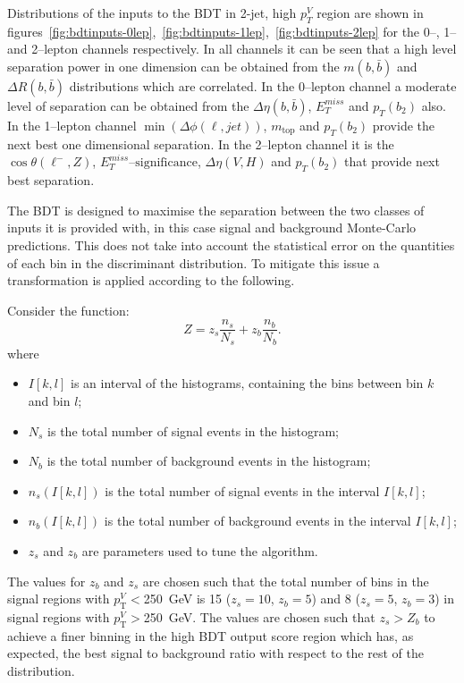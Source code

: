 Distributions of the inputs to the BDT in 2-jet, high $p_T^V$ region are shown
in
figures~\ref{fig:bdtinputs-0lep},~\ref{fig:bdtinputs-1lep},~\ref{fig:bdtinputs-2lep}
for the 0--, 1-- and 2--lepton channels respectively. In all channels it can be
seen that a high level separation power in one dimension can be obtained from
the $m(b,\bar{b})$ and $\Delta R (b, \bar{b})$ distributions which are
correlated. In the 0--lepton channel a moderate level of separation can be
obtained from the $\Delta \eta(b, \bar{b})$, $E_T^{miss}$ and $p_T(b_2)$ also.
In the 1--lepton channel $\min(\Delta\phi(\ell,jet))$, $m_{\text{top}}$ and
$p_T(b_2)$ provide the next best one dimensional separation. In the 2--lepton
channel it is the $\cos{\theta(\ell^-,Z)}$, $E_T^{miss}\text{--significance}$,
$\Delta \eta(V, H)$ and $p_T(b_2)$ that provide next best separation.


The BDT is designed to maximise the separation between the two classes of inputs
it is provided with, in this case signal and background Monte-Carlo predictions.
This does not take into account the statistical error on the quantities of each
bin in the discriminant distribution. To mitigate this issue a transformation is
applied according to the following.

Consider the function:
\begin{equation}
  Z = z_{s}\frac{n_{s}}{N_{s}} + z_{b}\frac{n_{b}}{N_{b}}.
\end{equation}
where
\begin{itemize}
\item $I[k,l]$ is an interval of the histograms, containing the bins between bin
  $k$ and bin $l$;
\item $N_{s}$ is the total number of signal events in the histogram;
\item $N_{b}$ is the total number of background events in the histogram;
\item $n_{s}(I[k,l])$ is the total number of signal events in the interval
  $I[k,l]$;
\item $n_{b}(I[k,l])$ is the total number of background events in the interval
  $I[k,l]$;
\item $z_{s}$ and $z_{b}$ are parameters used to tune the algorithm.
\end{itemize}
The values for $z_{b}$ and $z_{s}$ are chosen such that the total number of bins
in the signal regions with $p_{\text{T}}^V<$\SI{250}{\GeV} is 15 ($z_{s}=10$,
$z_{b}=5$) and 8 ($z_{s}=5$, $z_{b}=3$) in signal regions with
$p_{\text{T}}^V>$\SI{250}{\GeV}. The values are chosen such that $z_{s} > Z_{b}$
to achieve a finer binning in the high BDT output score region which has, as
expected, the best signal to background ratio with respect to the rest of the
distribution.

